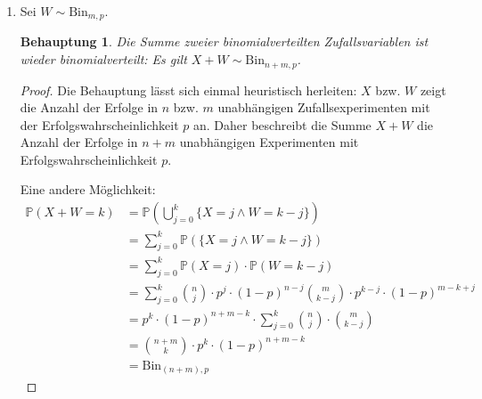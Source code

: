 \documentclass[a4paper]{scrartcl}
\newtheorem*{behaupt}{Behauptung}
\newcommand{\prob}{\mathbb{P}}
\begin{document}
\begin{enumerate}[label=\bfseries 1.\arabic*]
\begin{enumerate}[label=\alph*)]
            \item
                Sei $W \sim \text{Bin}_{m,p}$.

                \begin{behaupt}
                    Die Summe zweier binomialverteilten Zufallsvariablen ist
                    wieder binomialverteilt:
                    Es gilt $X + W \sim \text{Bin}_{n+m,p}$.
                \end{behaupt}
                \begin{proof}
                    Die Behauptung lässt sich einmal heuristisch herleiten: $X$
                    bzw. $W$ zeigt die Anzahl der Erfolge in $n$ bzw. $m$
                    unabhängigen Zufallsexperimenten mit der
                    Erfolgswahrscheinlichkeit $p$ an. Daher beschreibt die
                    Summe $X + W$ die Anzahl der Erfolge in $n+m$ unabhängigen
                    Experimenten mit Erfolgswahrscheinlichkeit $p$.

                    Eine andere Möglichkeit:
                    \begin{equation*}
                        \begin{split}
                            \prob(X+W=k)
                            &= \prob \left( \bigcup_{j=0}^k \{X=j \land W=k-j\}
                            \right) \\
                            &= \sum_{j=0}^k \prob (\{X=j \land W=k-j\}) \\
                            &= \sum_{j=0}^k \prob (X=j) \cdot \prob(W=k-j) \\
                            &= \sum_{j=0}^k
                            \binom{n}{j} \cdot p^j \cdot (1-p)^{n-j}
                            \binom{m}{k-j} \cdot p^{k-j} \cdot (1-p)^{m-k+j} \\
                            &= p^k \cdot (1-p)^{n+m-k} \cdot
                            \sum_{j=0}^k \binom{n}{j} \cdot \binom{m}{k-j} \\
                            &= \binom{n+m}{k} \cdot p^k \cdot (1-p)^{n+m-k} \\
                            &= \text{Bin}_{(n+m),p}
                        \end{split}
                    \end{equation*}
                \end{proof}


\end{enumerate}
\end{enumerate}
\end{document}
